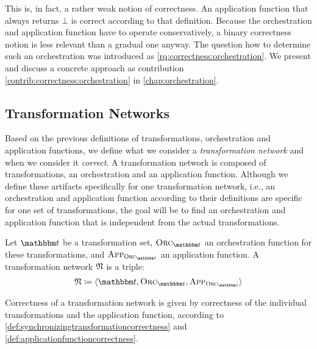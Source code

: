 This is, in fact, a rather weak notion of correctness.
An application function that always returns $\bot$ is correct according to that definition.
Because the orchestration and application function have to operate conservatively, a binary correctness notion is less relevant than a gradual one anyway.
The question how to determine such an orchestration was introduced as \autoref{rq:correctness:orchestration}.
We present and discuss a concrete approach as contribution \autoref{contrib:correctness:orchestration} in \autoref{chap:orchestration}.


\subsection{Transformation Networks}

Based on the previous definitions of transformations, orchestration and application functions, we define what we consider a \emph{transformation network} and when we consider it \emph{correct}.
A transformation network is composed of transformations, an orchestration and an application function.
Although we define these artifacts specifically for one transformation network, i.e., an orchestration and application function according to their definitions are specific for one set of transformations, the goal will be to find an orchestration and application function that is independent from the actual transformations.

\begin{definition}
    \label{def:transformationnetwork}
    Let $\transformationset{T}$ be a transformation set, $\orcfunction{\transformationset{T}}$ an orchestration function for these transformations, and $\appfunction{\orcfunction{\transformationset{T}}}$ an application function.
    A transformation network $\transformationnetwork{N}$ is a triple:
    \begin{align*}
        \transformationnetwork{N} \equalsperdefinition \tupled{\transformationset{T}, \orcfunction{\transformationset{T}}, \appfunction{\orcfunction{\transformationset{T}}}}
    \end{align*}
\end{definition}

Correctness of a transformation network is given by correctness of the individual transformations and the application function, according to \autoref{def:synchronizingtransformationcorrectness} and \autoref{def:applicationfunctioncorrectness}.

